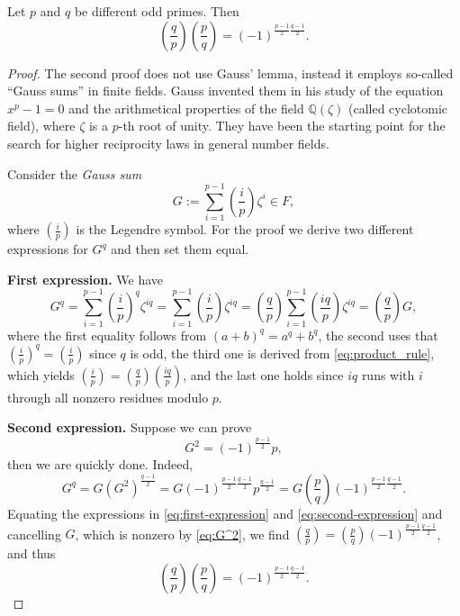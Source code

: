 \begin{theorem}
  \label{quadratic_reciprocity2}
  \leanok
  Let $p$ and $q$ be different odd primes. Then
  \[
  (\frac{q}{p})(\frac{p}{q}) = (-1)^{\frac{p-1}{2} \frac{q-1}{2}}.
  \]
\end{theorem}
\begin{proof}
  The second proof does not use Gauss' lemma, instead it employs so-called ``Gauss sums'' in finite fields. Gauss invented them in his study of the equation $x^p - 1 = 0$ and the arithmetical properties of the field $\mathbb{Q}(\zeta)$ (called cyclotomic field), where $\zeta$ is a $p$-th root of unity. They have been the starting point for the search for higher reciprocity laws in general number fields.
  
  Consider the \textit{Gauss sum}
  \[
  G := \sum_{i=1}^{p-1} (\frac{i}{p}) \zeta^i \in F,
  \]
  where $(\frac{i}{p})$ is the Legendre symbol. For the proof we derive two different expressions for $G^q$ and then set them equal.
  
  \textbf{First expression.} We have
  \begin{equation} \label{eq:first-expression}
  G^q = \sum_{i=1}^{p-1} (\frac{i}{p})^q \zeta^{iq} = \sum_{i=1}^{p-1} (\frac{i}{p}) \zeta^{iq} = (\frac{q}{p}) \sum_{i=1}^{p-1} (\frac{iq}{p}) \zeta^{iq} = (\frac{q}{p}) G,
  \end{equation}
  where the first equality follows from $(a + b)^q = a^q + b^q$, the second uses that $(\frac{i}{p})^q = (\frac{i}{p})$ since $q$ is odd, the third one is derived from \eqref{eq:product_rule}, which yields $(\frac{i}{p}) = (\frac{q}{p}) (\frac{iq}{p})$, and the last one holds since $iq$ runs with $i$ through all nonzero residues modulo $p$.
  
  \textbf{Second expression.} Suppose we can prove
  \begin{equation} \label{eq:G^2}
  G^2 = (-1)^{\frac{p-1}{2}} p,
  \end{equation}
  then we are quickly done. Indeed,
  \begin{equation} \label{eq:second-expression}
  G^q = G (G^2)^{\frac{q-1}{2}} = G (-1)^{\frac{p-1}{2} \frac{q-1}{2}} p^{\frac{q-1}{2}} = G (\frac{p}{q}) (-1)^{\frac{p-1}{2} \frac{q-1}{2}}.
  \end{equation}
  Equating the expressions in \eqref{eq:first-expression} and \eqref{eq:second-expression} and cancelling $G$, which is nonzero by \eqref{eq:G^2}, we find $(\frac{q}{p}) = (\frac{p}{q}) (-1)^{\frac{p-1}{2} \frac{q-1}{2}}$, and thus
  \[
  (\frac{q}{p}) (\frac{p}{q}) = (-1)^{\frac{p-1}{2} \frac{q-1}{2}}.
  \]
  

\end{proof}
